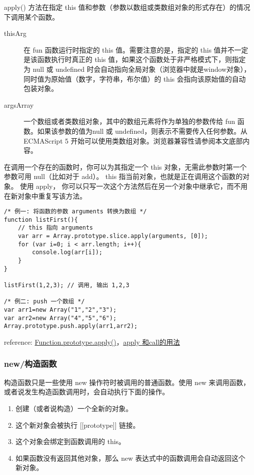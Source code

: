 apply() 方法在指定 this 值和参数（参数以数组或类数组对象的形式存在）的情况下调用某个函数。

\begin{description}
\item[thisArg] 在 fun 函数运行时指定的 this 值。需要注意的是，指定的 this 值并不一定是该函数执行时真正的 this 值，如果这个函数处于非严格模式下，则指定为 null 或 undefined 时会自动指向全局对象（浏览器中就是window对象），同时值为原始值（数字，字符串，布尔值）的 this 会指向该原始值的自动包装对象。



\item[argsArray] 一个数组或者类数组对象，其中的数组元素将作为单独的参数传给 fun 函数。如果该参数的值为null 或 undefined，则表示不需要传入任何参数。从ECMAScript 5 开始可以使用类数组对象。浏览器兼容性请参阅本文底部内容。
\end{description}

在调用一个存在的函数时，你可以为其指定一个 this 对象，无需此参数时第一个参数可用 null（比如对于 add）。 this 指当前对象，也就是正在调用这个函数的对象。 使用 apply， 你可以只写一次这个方法然后在另一个对象中继承它，而不用在新对象中重复写该方法。

\begin{verbatim}/* 例一: 将函数的参数 arguments 转换为数组 */
function listFirst(){
    // this 指向 arguments
    var arr = Array.prototype.slice.apply(arguments, [0]);
    for (var i=0; i < arr.length; i++){
        console.log(arr[i]);
    }
}

listFirst(1,2,3); // 调用, 输出 1,2,3

/* 例二: push 一个数组 */
var arr1=new Array("1","2","3");
var arr2=new Array("4","5","6");
Array.prototype.push.apply(arr1,arr2); 
\end{verbatim}

reference: \href{https://developer.mozilla.org/zh-CN/docs/Web/JavaScript/Reference/Global\_Objects/Function/apply}{Function.prototype.apply()}，\href{http://segmentfault.com/a/1190000000725712}{apply 和call的用法}

\subsubsection{new/构造函数}\hypertarget{new}{}\label{new}

构造函数只是一些使用 new 操作符时被调用的普通函数。使用 new 来调用函数，或者说发生构造函数调用时，会自动执行下面的操作。

\begin{enumerate}
\item 创建（或者说构造）一个全新的对象。
\item 这个新对象会被执行 [[prototype]] 链接。
\item 这个对象会绑定到函数调用的 this。
\item 如果函数没有返回其他对象，那么 new 表达式中的函数调用会自动返回这个新对象。
\end{enumerate}


